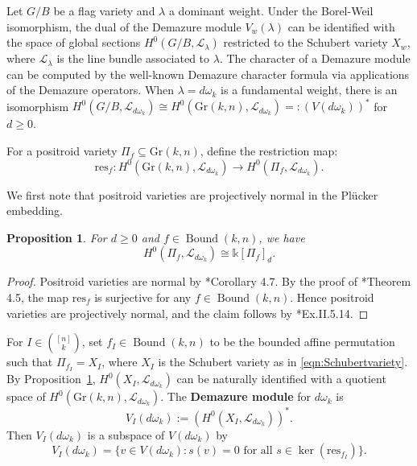 \documentclass[12pt,reqno]{amsart}
\newtheorem{prop}[lemma]{Proposition}
\theoremstyle{definition}
\renewcommand{\k}{\mathbb{k}}
\newcommand{\res}{\mathrm{res}}
\newcommand{\gr}{\mathrm{Gr}}
\newcommand{\bound}{\operatorname{Bound}}
\begin{document}
{Let $G/B$ be a flag variety and $\lambda$ a dominant weight.
Under the Borel-Weil isomorphism, the dual of the Demazure module $V_{w}(\lambda)$ can be identified with the space of global sections $H^0(G/B, \mathcal{L}_\lambda)$ restricted to the Schubert variety $X_w$, where $\mathcal{L}_\lambda$ is the line bundle associated to $\lambda$. The character of a Demazure module can be computed by the well-known Demazure character formula via applications of the Demazure operators. When $\lambda=d\omega_k$ is a fundamental weight, there is an isomorphism $H^0(G/B,\mathcal{L}_{d\omega_k})\cong H^0(\gr(k,n),\mathcal{L}_{d\omega_k}) =: (V(d\omega_k))^\ast$ for $d\ge 0$. 

For a positroid variety $\Pi_f\subseteq \gr(k,n)$, define the restriction map:
\begin{equation}
    \res_f: H^0(\gr(k,n),\mathcal{L}_{d\omega_k})\longrightarrow H^0(\Pi_f,\mathcal{L}_{d\omega_k}).
\end{equation}

We first note that positroid varieties are projectively normal in the Pl\"ucker embedding. 
\begin{prop}
\label{prop:section-coord-d}
     For $d\ge 0$ and $f\in\bound(k,n)$, we have
     \begin{equation}
     H^0(\Pi_f, \mathcal{L}_{d\omega_k})\cong \k[\Pi_f]_d.
     \end{equation}
\end{prop}
\begin{proof}
    Positroid varieties are normal by \cite{KLS2014projections}*{Corollary 4.7}. By the proof of  \cite{KLS2014projections}*{Theorem 4.5}, the map $\res_f$ is surjective for any $f\in\bound(k,n)$. Hence positroid varieties are projectively normal, and the claim follows by \cite{hartshorne1977algebraic}*{Ex.II.5.14}.
\end{proof}
For $I\in {[n]\choose k}$, set $f_I\in \bound(k,n)$ to be the bounded affine permutation such that $\Pi_{f_I} = X_I$, where $X_I$ is the Schubert variety as in \eqref{eqn:Schubertvariety}.
By Proposition~\ref{prop:section-coord-d}, 
$H^0(X_I,\mathcal{L}_{d\omega_k})$ can be naturally identified with a quotient space of $H^0(\gr(k,n),\mathcal{L}_{d\omega_k})$. 
The \textbf{Demazure module} for $d\omega_k$ is
\begin{equation}
    V_{I}(d\omega_k) := (H^0(X_I,\mathcal{L}_{d\omega_k}))^*.
\end{equation}
Then $V_{I}(d\omega_k)$ is a subspace of $V(d\omega_k)$ by 
\begin{equation}\label{eqn:demazuremod}
    V_{I}(d\omega_k) = \{v\in V(d\omega_k): s(v) = 0 \text{ for all }s\in \ker(\res_{f_I})\}.
\end{equation}

}
\end{document}
